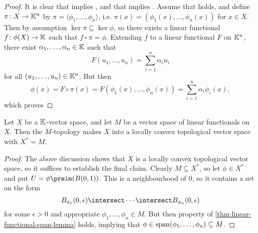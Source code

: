\documentclass[article, a4paper, 11pt, oneside]{memoir}
\numberwithin{equation}{chapter}
\begin{document}
\begin{proof}
    It is clear that  implies , and that  implies . Assume that  holds, and define $\pi \colon X \to \mathbb{K}^n$ by $\pi = \langle \phi_1, \ldots, \phi_n \rangle$, i.e. $\pi(x) = (\phi_1(x), \ldots, \phi_n(x))$ for $x \in X$. Then by assumption $\ker\pi \subseteq \ker\phi$, so there exists a linear functional $f \colon \phi(X) \to \mathbb{K}$ such that $f \circ \pi = \phi$. Extending $f$ to a linear functional $F$ on $\mathbb{K}^n$, there exist $\alpha_1, \ldots, \alpha_n \in \mathbb{K}$ such that
    \begin{equation*}
        F(u_1, \ldots, u_n)
            = \sum_{i=1}^n \alpha_i u_i
    \end{equation*}
    for all $(u_1, \ldots, u_n) \in \mathbb{K}^n$. But then
    \begin{equation*}
        \phi(x)
            = F \circ \pi(x)
            = F(\phi_1(x), \ldots, \phi_n(x))
            = \sum_{i=1}^n \alpha_i \phi_i(x),
    \end{equation*}
    which proves 
\end{proof}


\begin{theorem}
    \label{thm:linear-functionals-create-LCS}
    Let $X$ be a $\mathbb{K}$-vector space, and let $M$ be a vector space of linear functionals on $X$. Then the $M$-topology makes $X$ into a locally convex topological vector space with $X^* = M$.
\end{theorem}

\begin{proof}
    The above discussion shows that $X$ is a locally convex topological vector space, so it suffices to establish the final claim. Clearly $M \subseteq X^*$, so let $\phi \in X^*$ and put $U = \phi\preim(\ball{0}{1})$. This is a neighbourhood of $0$, so it contains a set on the form
    \begin{equation*}
        \ball[\phi_1]{0}{\epsilon}
            \intersect \cdots
            \intersect \ball[\phi_n]{0}{\epsilon}
    \end{equation*}
    for some $\epsilon > 0$ and appropriate $\phi_1, \ldots, \phi_n \in M$. But then property  of \cref{thm:linear-functional-span-lemma} holds, implying that $\phi \in \operatorname{span}(\phi_1, \ldots, \phi_n) \subseteq M$.
\end{proof}
\end{document}
